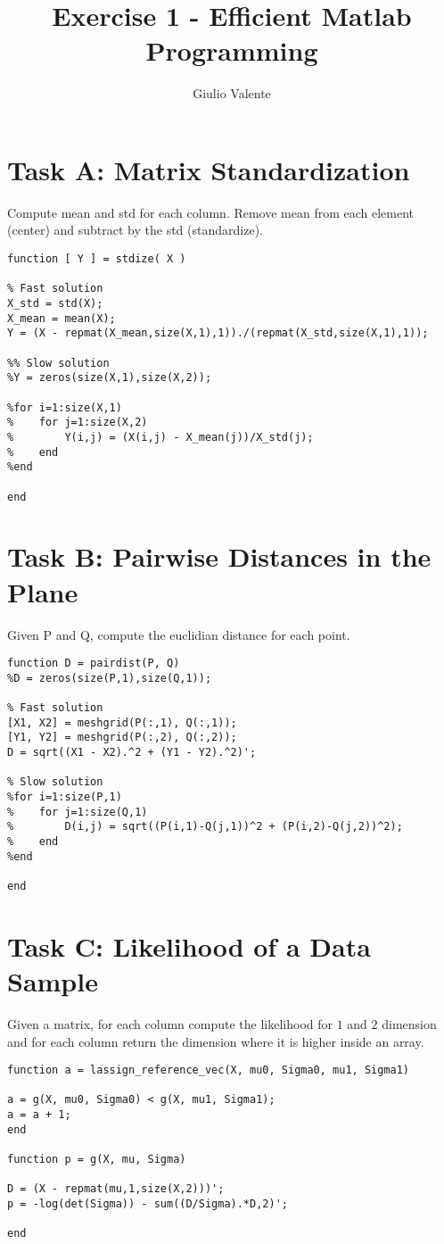 \documentclass{article}
\author{Giulio Valente}
\title{Exercise 1 - Efficient Matlab Programming}
\begin{document}
\date{}
\maketitle

\section{Task A: Matrix Standardization}
Compute mean and std for each column. Remove mean from each element (center) and
subtract by the std (standardize).
\begin{verbatim}
function [ Y ] = stdize( X )

% Fast solution
X_std = std(X);
X_mean = mean(X);
Y = (X - repmat(X_mean,size(X,1),1))./(repmat(X_std,size(X,1),1));

%% Slow solution
%Y = zeros(size(X,1),size(X,2));

%for i=1:size(X,1)
%    for j=1:size(X,2)
%        Y(i,j) = (X(i,j) - X_mean(j))/X_std(j);
%    end
%end

end
\end{verbatim}

\section{Task B: Pairwise Distances in the Plane}
Given P and Q, compute the euclidian distance for each point.
\begin{verbatim}
function D = pairdist(P, Q)
%D = zeros(size(P,1),size(Q,1));

% Fast solution
[X1, X2] = meshgrid(P(:,1), Q(:,1));
[Y1, Y2] = meshgrid(P(:,2), Q(:,2));
D = sqrt((X1 - X2).^2 + (Y1 - Y2).^2)';

% Slow solution
%for i=1:size(P,1)
%    for j=1:size(Q,1)
%        D(i,j) = sqrt((P(i,1)-Q(j,1))^2 + (P(i,2)-Q(j,2))^2);
%    end
%end

end
\end{verbatim}

\section{Task C: Likelihood of a Data Sample}
Given a matrix, for each column compute the likelihood for $1$ and $2$ dimension
and for each column return the dimension where it is higher inside an array.
\begin{verbatim}
function a = lassign_reference_vec(X, mu0, Sigma0, mu1, Sigma1)

a = g(X, mu0, Sigma0) < g(X, mu1, Sigma1);
a = a + 1;
end

function p = g(X, mu, Sigma)

D = (X - repmat(mu,1,size(X,2)))';
p = -log(det(Sigma)) - sum((D/Sigma).*D,2)';

end
\end{verbatim} 
\end{document}
